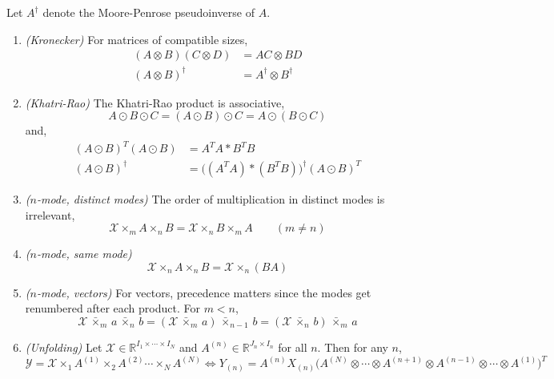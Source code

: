   \begin{lemma}
    \label{thm:products}
    Let $A^\dagger$ denote the Moore-Penrose pseudoinverse of $A$.
    \begin{enumerate}
      \item \textit{(Kronecker)} For matrices of compatible sizes,
      \begin{align}
        (A \otimes B)(C \otimes D) & = AC \otimes BD \\
        (A \otimes B)^\dagger & = A^\dagger \otimes B^\dagger
      \end{align}

      \item \textit{(Khatri-Rao)} The Khatri-Rao product is associative,
      \begin{equation}
        A \odot B \odot C = (A \odot B) \odot C = A \odot (B \odot C)
      \end{equation}
      and,
      \begin{align}
        (A \odot B)^T (A \odot B) & = A^T A * B^T B \\
        (A \odot B)^\dagger & = \big( (A^T A) * (B^T B) \big)^\dagger (A \odot B)^T
      \end{align}

      \item \textit{($n$-mode, distinct modes)} The order of multiplication in distinct modes is irrelevant,
      \begin{equation}
        \mathcal{X} \times_m A \times_n B = \mathcal{X} \times_n B \times_m A \qquad (m \neq n)
      \end{equation}

      \item \textit{($n$-mode, same mode)}
      \begin{equation}
        \mathcal{X} \times_n A \times_n B = \mathcal{X} \times_n (BA)
      \end{equation}

      \item \textit{($n$-mode, vectors)} For vectors, precedence matters since the modes get renumbered after each product. For $m < n$,
      \begin{equation}
        \mathcal{X} \,\bar{\times}_m\, a \,\bar{\times}_n\, b = (\mathcal{X} \,\bar{\times}_m\, a) \,\bar{\times}_{n-1}\, b = (\mathcal{X} \,\bar{\times}_n\, b) \,\bar{\times}_m\, a
      \end{equation}

      \item \textit{(Unfolding)} Let $\mathcal{X} \in \mathbb{R}^{I_1 \times \cdots \times I_N}$ and $A^{(n)} \in \mathbb{R}^{J_n \times I_n}$ for all $n$. Then for any $n$,
      \begin{equation}
        \mathcal{Y} = \mathcal{X} \times_1 A^{(1)} \times_2 A^{(2)} \cdots \times_N A^{(N)} \iff Y_{(n)} = A^{(n)} X_{(n)} \big( A^{(N)} \otimes \cdots \otimes A^{(n+1)} \otimes A^{(n-1)} \otimes \cdots \otimes A^{(1)} \big)^T
      \end{equation}
    \end{enumerate}
  \end{lemma}
